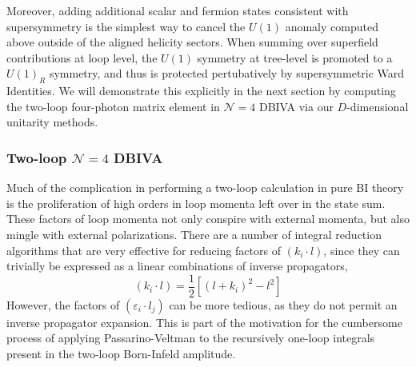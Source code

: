 \documentclass[11pt,letter]{article}
\begin{document}
Moreover, adding additional scalar and fermion states consistent with supersymmetry is the simplest way to cancel the $U(1)$ anomaly computed above outside of the aligned helicity sectors. When summing over superfield contributions at loop level, the $U(1)$ symmetry at tree-level is promoted to a $U(1)_R$ symmetry, and thus is protected pertubatively by supersymmetric Ward Identities. We will demonstrate this explicitly in the next section by computing the two-loop four-photon matrix element in $\mathcal{N}=4$ DBIVA via our $D$-dimensional unitarity methods. 

\subsubsection{Two-loop $\mathcal{N}=4$ DBIVA}\label{sec:2loopN4U}
Much of the complication in performing a two-loop calculation in pure BI theory is the proliferation of high orders in loop momenta left over in the state sum. These factors of loop momenta not only conspire with external momenta, but also mingle with external polarizations. There are a number of integral reduction algorithms \cite{Anastasiou:2004vj,vonManteuffel:2012np,Smirnov:2014hma,vonManteuffel:2014ixa,Smirnov:2019qkx,Smirnov:2020quc,Usovitsch:2020jrk,Maierhofer:2018gpa} that are very effective for reducing factors of $(k_i \cdot l)$, since they can trivially be expressed as a linear combinations of inverse propagators,
\begin{equation}
(k_i \cdot l) = \frac{1}{2}\left[(l+k_i)^2-l^2\right]
\end{equation}
However, the factors of $(\varepsilon_i\cdot l_j)$ can be more tedious, as they do not permit an inverse propagator expansion. This is part of the motivation for the cumbersome process of applying Passarino-Veltman to the recursively one-loop integrals present in the two-loop Born-Infeld amplitude.  
\end{document}

